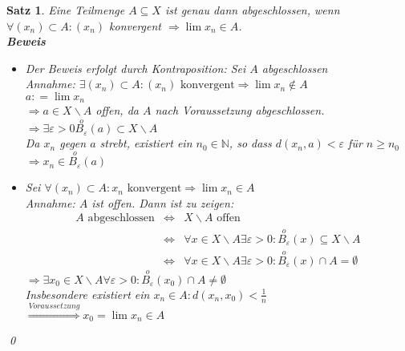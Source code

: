 \documentclass[ngerman,titlepage,twoside, parskip=half*]{scrreprt}
\newcommand*{\N}{\mathbb{N}}
\theoremstyle{plain}
\newtheorem{theorem}{Satz}[section]
\theoremstyle{definition}
\theoremstyle{remark}
\newcommand*{\coloneqq}{\mathrel{\mathop:}=}
\begin{document}
\begin{theorem}
\label{satz:abgTeilmenge}
Eine Teilmenge $A\subseteq X$ ist genau dann abgeschlossen, wenn $\forall (x_n) \subset A\colon(x_n)$
konvergent $\Rightarrow \lim x_n \in A$.\\
\textbf{Beweis}
\begin{itemize}
  \item["`$\Rightarrow$"'] Der Beweis erfolgt durch Kontraposition: Sei $A$ abgeschlossen\\
    Annahme: $\exists (x_n)\subset A\colon(x_n) \text{ konvergent} \Rightarrow \lim x_n \notin A$\\
    $a\coloneqq\lim x_n$\\
    $\Rightarrow a \in X\backslash A$ offen, da $A$ nach Voraussetzung abgeschlossen.\\
    $\Rightarrow \exists \varepsilon >0 \stackrel{o}{B_{\varepsilon}}(a)\subset X\backslash A$\\
    Da $x_n$ gegen $a$ strebt, existiert ein $n_0\in \N$, so dass $d(x_n,a)<\varepsilon$ für $n\geq n_0$\\
    $\Rightarrow x_n \in \stackrel{o}{B_{\varepsilon}}(a)$\textnormal{\lightning}
  \item["`$\Leftarrow$"'] Sei $\forall (x_n)\subset A\colon x_n \text{ konvergent} \Rightarrow \lim x_n \in A$\\
    Annahme: $A$ ist offen. Dann ist zu zeigen:
    \begin{align*}
      A \text{ abgeschlossen} & \Leftrightarrow & X\backslash A \text{ offen}\\
      & \Leftrightarrow & \forall x \in X\backslash A \exists \varepsilon >0\colon\stackrel{o}{B_{\varepsilon}}
      (x)\subseteq X\backslash A\\
      & \Leftrightarrow & \forall x \in X\backslash A \exists \varepsilon >0\colon\stackrel{o}{B_{\varepsilon}}
      (x)\cap A = \emptyset
    \end{align*}
    $\Rightarrow \exists x_0 \in X\backslash A \forall \varepsilon >0\colon\stackrel{o}{B_{\varepsilon}}(x_0)
    \cap A \neq \emptyset$\\
    Insbesondere existiert ein $x_n \in A \colon d(x_n,x_0)<\frac{1}{n}$\\
    $\stackrel{Voraussetzung}{\Longrightarrow}x_0=\lim x_n \in A$\textnormal{\lightning}
\end{itemize}
\qed
\end{theorem}
\end{document}
